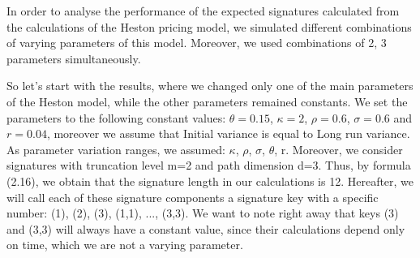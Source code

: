 \documentclass[12pt,a4paper]{report}
\theoremstyle{definition}
\begin{document}




In order to analyse the performance of the expected signatures calculated from the calculations of the Heston pricing model, we simulated different combinations of varying parameters of this model. Moreover, we used combinations of 2, 3 parameters simultaneously. %

So let's start with the results, where we changed only one of the main parameters of the Heston model, while the other parameters remained constants. We set the parameters to the following constant values: $\theta=0.15$, $\kappa=2$, $\rho=0.6$, $\sigma=0.6$ and $r=0.04$, moreover we assume that Initial variance is equal to Long run variance. As parameter variation ranges, we assumed: $\kappa$, $\rho$, $\sigma$, $\theta$, r. Moreover, we consider signatures with truncation level m=2 and path dimension d=3. Thus, by formula (2.16), we obtain that the signature length in our calculations is 12. Hereafter, we will call each of these signature components a signature key with a specific number: (1), (2), (3), (1,1), ..., (3,3). We want to note right away that keys (3) and (3,3) will always have a constant value, since their calculations depend only on time, which we are not a varying parameter.
\end{document}
